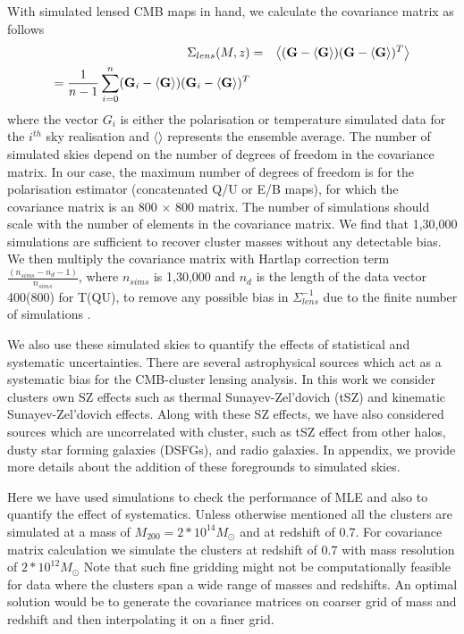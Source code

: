  
 With simulated lensed CMB maps in hand, we calculate the covariance matrix as follows
 \begin{eqnarray}
\Sigma_{lens}(M,z) & = & \left<(\textrm{\textbf{G}} - \left<\textrm{\textbf{G}}\right>) (\textrm{\textbf{G}} - \left<\textrm{\textbf{G}}\right>)^{T}\right>\\
  =   \frac{1}{n-1}\sum\limits_{i = 0}^{n} (\textrm{\textbf{G}}_{i} - \left<\textrm{\textbf{G}}\right>) (\textrm{\textbf{G}}_{i} - \left<\textrm{\textbf{G}}\right>)^{T} %
\label{eq_lensed_cmb_cov_mass_z}
\end{eqnarray}
 where the vector $G_{i}$ is either the polarisation or temperature simulated data for the $i^{th}$ sky realisation and $\langle \rangle$ represents the ensemble average. 
 The number of simulated skies depend on the number of degrees of freedom in the covariance matrix. 
 In our case, the maximum number of degrees of freedom is for the polarisation estimator (concatenated Q/U or E/B maps), for which the covariance matrix is an 800 $\times$ 800 matrix. %
 The number of simulations should scale with the number of elements in the covariance matrix. 
  We find that 1,30,000 simulations are sufficient to recover cluster masses without any detectable bias. 
  We then multiply the covariance matrix with Hartlap correction term $\frac{(n_{sims} -n_{d} -1)}{n_{sims}}$, where $n_{sims}$ is 1,30,000 and $n_{d}$ is the length of the data vector 400(800) for T(QU), to remove any possible bias in $\Sigma^{-1}_{lens}$ due to the finite number of simulations \citep{hartlap06}. 
  
 We also use these simulated skies to quantify the effects of statistical and systematic uncertainties.
 There are several astrophysical sources which act as a systematic bias for the CMB-cluster lensing analysis. 
 In this work we consider clusters own SZ effects such as thermal Sunayev-Zel'dovich (tSZ) and kinematic Sunayev-Zel'dovich effects. 
 Along with these SZ effects, we have also considered sources which are uncorrelated with cluster, such as tSZ effect from other halos, dusty star forming galaxies (DSFGs), and radio galaxies.
 In appendix, we provide more details about the addition of these foregrounds to simulated skies.
 
Here we have used simulations to check the performance of MLE and also to quantify the effect of systematics. 
 Unless otherwise mentioned all the clusters are simulated at a mass of $M_{200} = 2*10^{14} M_{\odot}$ %
 and at redshift of 0.7.
 For covariance matrix calculation we simulate the clusters at redshift of $0.7$ with mass resolution of $2*10^{12} M_{\odot}$
 Note that such fine gridding might not be computationally feasible for data where the clusters span a wide range of masses and redshifts.
 An optimal solution would be to generate the covariance matrices on coarser grid of mass and redshift and then interpolating it on a finer grid.  
 
